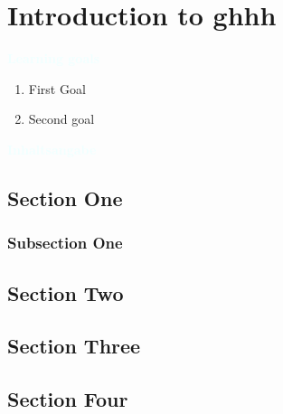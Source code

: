 \documentclass[letterpaper]{book}
\begin{document}
  \chapter{Introduction to ghhh}
    \begin{multicols}{2}

      \begin{minipage}[t]{\linewidth}
      \textcolor{azure}{\large\bfseries Learning goals}
        \begin{enumerate}[label=\color{azure}\theenumi.]
          \item  First Goal
          \item  Second goal
        \end{enumerate}
      \end{minipage}

      \begin{minipage}[t]{\linewidth}
      \textcolor{azure}{\large\bfseries Inhaltsangabe}
        \minitoc
      \end{minipage}

    \end{multicols}

  \section{Section One}
    \subsection{Subsection One}
  \section{Section Two}
  \section{Section Three}
  \section{Section Four}
\end{document}
